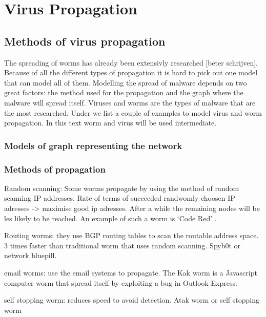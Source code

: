 \chapter{Virus Propagation }
\label{chapter4: Virus propagation}

\section{Methods of virus propagation}

The spreading of worms has already been extensivly researched [beter schrijven]. Because of all the different types of propagation it is hard to pick out one model that can model all of them. Modelling the spread of malware depends on two great factors: the method used for the propagation and the graph where the malware will spread itself. Viruses and worms are the types of malware that are the most researched. Under we list a couple of examples to model virus and worm propagation. In this text worm and virus will be used intermediate. 

\subsection{Models of graph representing the network}

\subsection*{Methods of propagation}

\begin{description}
\item Random scanning: Some worms propagate by using the method of random scanning 
IP addresses.  Rate of terms of succeeded randwomly choosen IP adresses -> maximise good ip adresses. After a while the remaining nodes will be les likely to be reached. An example of such a worm is `Code Red' .
\item Routing worms: they use BGP routing tables to scan the routable address space. 3 times faster than traditional worm that uses random scanning. Spyb0t or network bluepill.
\item email worms: use the email systems to propagate. The Kak worm is a Javascript computer worm that spread itself by exploiting a bug in Outlook Express. 
\item self stopping worm: reduces speed to avoid detection. Atak worm or self stopping worm
\end{description}


